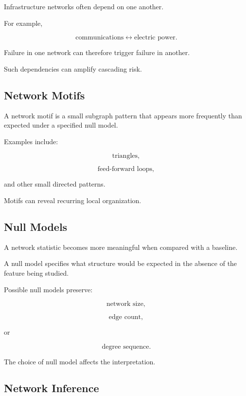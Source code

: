 Infrastructure networks often depend on one another.

For example,

\[
\boxed{
\text{communications}
\leftrightarrow
\text{electric power}.
}
\]

Failure in one network can therefore trigger failure in another.

Such dependencies can amplify cascading risk.

\subsection{Network Motifs}
\label{subsec:network-motifs}

A network motif is a small subgraph pattern that appears more frequently than
expected under a specified null model.

Examples include:

\[
\boxed{
\text{triangles},
}
\]

\[
\boxed{
\text{feed-forward loops},
}
\]

and other small directed patterns.

Motifs can reveal recurring local organization.

\subsection{Null Models}
\label{subsec:network-null-models}

A network statistic becomes more meaningful when compared with a baseline.

A null model specifies what structure would be expected in the absence of the
feature being studied.

Possible null models preserve:

\[
\boxed{
\text{network size},
}
\]

\[
\boxed{
\text{edge count},
}
\]

or

\[
\boxed{
\text{degree sequence}.
}
\]

The choice of null model affects the interpretation.

\subsection{Network Inference}
\label{subsec:network-inference}


